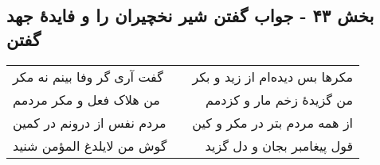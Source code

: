 \begin{center}
\section*{بخش ۴۳ - جواب گفتن شیر نخچیران را و فایدهٔ جهد گفتن}
\label{sec:sh043}
\begin{longtable}{l p{0.5cm} r}
گفت آری گر وفا بینم نه مکر
&&
مکرها بس دیده‌ام از زید و بکر
\\
من هلاک فعل و مکر مردمم
&&
من گزیدهٔ زخم مار و کزدمم
\\
مردم نفس از درونم در کمین
&&
از همه مردم بتر در مکر و کین
\\
گوش من لایلدغ المؤمن شنید
&&
قول پیغامبر بجان و دل گزید
\\
\end{longtable}
\end{center}
